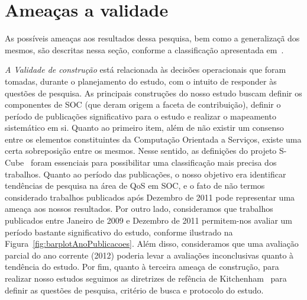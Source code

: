 \section{Amea\c cas a validade}\label{sec:ameacas}

As poss\'{i}veis amea\c{c}as aos resultados dessa pesquisa, bem como a generaliza\c c\~{a} dos mesmos, s\~{a}o descritas nessa se\c c\~{a}o, conforme a classifica\c c\~{a}o apresentada em~\cite{leedy1980practical}. 

\emph{A Validade de constru\c c\~{a}o} est\'{a} relacionada
\`{a}s decis\~{o}es operacionais que foram tomadas, durante o
planejamento do estudo, com o intuito de responder \`{a}s quest\~{o}es de
pesquisa. As principais constru\c{c}\~{o}es do nosso estudo buscam definir os componentes de SOC (que deram 
origem a faceta de contribui\c c\~{a}o), definir o per\'{i}odo de publica\c{c}\~{o}es significativo para o estudo e realizar o mapeamento sistemático em si. 
Quanto ao primeiro item, al\'{e}m de n\~{a}o existir um consenso entre os elementos constituintes da Computa\c c\~{a}o Orientada a Servi\c cos, existe uma certa 
sobreposi\c c\~{a}o entre os mesmos. Nesse sentido, as defini\c c\~{o}es do projeto S-Cube~\cite{SCube-FINALREPORT}  foram essenciais para 
possibilitar uma classifica\c c\~{a}o mais precisa dos trabalhos.
Quanto ao per\'{i}odo das publica\c c\~{o}es, o nosso objetivo era identificar tend\^{e}ncias de pesquisa na \'{a}rea de QoS em SOC, e o fato de n\~{a}o termos considerado trabalhos publicados ap\'{o}s Dezembro de 2011 pode representar uma amea\c ca aos nossos resultados. Por outro lado, consideramos que trabalhos publicados entre Janeiro de 2009 e Dezembro de 2011 permitem-nos avaliar um per\'{i}odo bastante significativo do estudo, conforme ilustrado na Figura~\ref{fig:barplotAnoPublicacoes}. Al\'{e}m disso, consideramos que uma avalia\c c\~{a}o parcial do ano corrente (2012) poderia levar a avalia\c{c}\~{o}es inconclusivas quanto \`{a} tend\^{e}ncia do estudo. Por fim, quanto \`{a} terceira amea\c{c}a de constru\c{c}\~{a}o, para realizar nosso estudos seguimos as diretrizes de ref\^{e}ncia de Kitchenham~\cite{kitchenham:techReport2007} para definir as quest\~{o}es de pesquisa, crit\'{e}rio de busca e protocolo do estudo.


